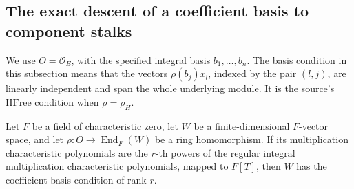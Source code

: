 \subsection{The exact descent of a coefficient basis to component stalks}
\label{subsec:faithful-free-stalk-transport}

We use \(O=\mathcal O_E\), with the specified integral basis
\(b_1,\ldots,b_n\).  The basis condition in this subsection means
that the vectors \(\rho(b_j)x_l\), indexed by the pair \((l,j)\),
are linearly independent and span the whole underlying module.
It is the source's \(\mathrm{HFree}\) condition when
\(\rho=\rho_H\).

\begin{srlemma}
\label{lem:faithful-free-charzero}
Let \(F\) be a field of characteristic zero, let \(W\) be a
finite-dimensional \(F\)-vector space, and let
\(\rho:O\to\operatorname{End}_F(W)\) be a ring homomorphism.
If its multiplication characteristic polynomials are the
\(r\)-th powers of the regular integral multiplication
characteristic polynomials, mapped to \(F[T]\), then \(W\) has
the coefficient basis condition of rank \(r\).
\end{srlemma}
